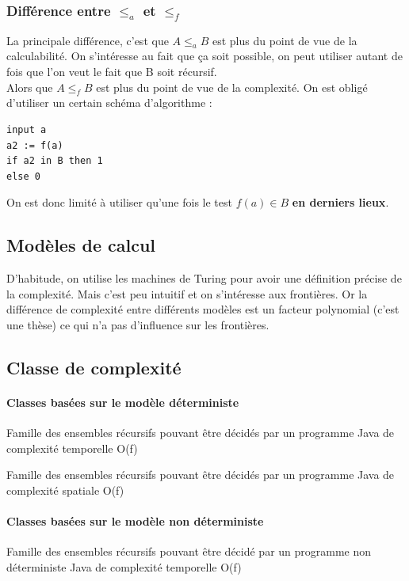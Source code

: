 \subsubsection{Différence entre $\leq_a$ et $\leq_f$}
La principale différence, c'est que $A \leq_a B$ est plus du point de vue de la 
calculabilité. On s'intéresse au fait que ça soit possible, on peut utiliser 
autant de fois que l'on veut le fait que B soit récursif. \\
Alors que $A \leq_f B$ est plus du point de vue de la complexité. On est 
obligé d'utiliser un certain schéma d'algorithme :

\begin{lstlisting}
input a
a2 := f(a)
if a2 in B then 1
else 0
\end{lstlisting}

On est donc limité à utiliser qu'une fois le test $f(a) \in B$ \textbf{en 
	derniers lieux}.

\subsection{Modèles de calcul}
D'habitude, on utilise les machines de Turing pour avoir une définition précise 
de la complexité. Mais c'est peu intuitif et on s'intéresse aux frontières. Or la 
différence de complexité entre différents modèles est un facteur polynomial 
(c'est une thèse) ce qui n'a pas d'influence sur les frontières.

\subsection{Classe de complexité}

\paragraph{Classes basées sur le modèle déterministe}
\begin{mydef}[DTIME(f)]
	Famille des ensembles récursifs pouvant être décidés par un programme 
	Java de complexité temporelle O(f)
\end{mydef}

\begin{mydef}[DSPACE(f)]
	Famille des ensembles récursifs pouvant être décidés par un programme 
	Java de complexité spatiale O(f)
\end{mydef}

\paragraph{Classes basées sur le modèle non déterministe}
\begin{mydef}[NDTIME(f)]
	Famille des ensembles récursifs pouvant être décidé par un programme 
	non déterministe Java de complexité temporelle O(f)
\end{mydef}

